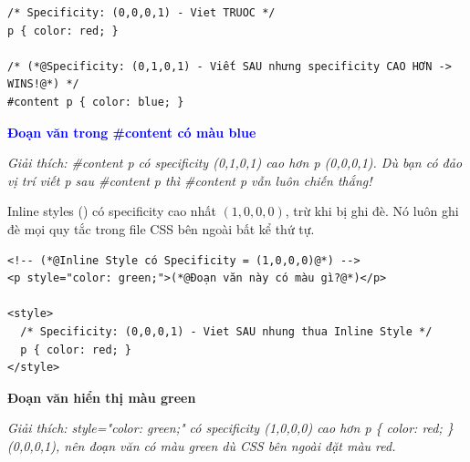 \begin{codeWindow}
\begin{lstlisting}[language=CSS3]
/* Specificity: (0,0,0,1) - Viet TRUOC */
p { color: red; }

/* (*@Specificity: (0,1,0,1) - Viết SAU nhưng specificity CAO HƠN -> WINS!@*) */
#content p { color: blue; }
\end{lstlisting}
\end{codeWindow}

\begin{browserWindow}
\sffamily\small
\textcolor{blue}{\textbf{Đoạn văn trong \#content có màu blue}} \par\vspace{4pt}
{\scriptsize\textcolor{gray!60}{\textit{Giải thích: \#content p có specificity (0,1,0,1) cao hơn p (0,0,0,1). Dù bạn có đảo vị trí viết p sau \#content p thì \#content p vẫn luôn chiến thắng!}}}
\end{browserWindow}

\begin{warnBox}
Inline styles () có specificity cao nhất $(1,0,0,0)$, trừ khi bị  ghi đè. Nó luôn ghi đè mọi quy tắc trong file CSS bên ngoài bất kể thứ tự.
\end{warnBox}

\begin{codeWindow}
\begin{lstlisting}[language=HTML5]
<!-- (*@Inline Style có Specificity = (1,0,0,0)@*) -->
<p style="color: green;">(*@Đoạn văn này có màu gì?@*)</p>

<style>
  /* Specificity: (0,0,0,1) - Viet SAU nhung thua Inline Style */
  p { color: red; }
</style>
\end{lstlisting}
\end{codeWindow}

\begin{browserWindow}
\sffamily\small
\textcolor{green!60!black}{\textbf{Đoạn văn hiển thị màu green}} \par\vspace{4pt}
{\scriptsize\textcolor{gray!60}{\textit{Giải thích: style="color: green;" có specificity (1,0,0,0) cao hơn p \{ color: red; \} (0,0,0,1), nên đoạn văn có màu green dù CSS bên ngoài đặt màu red.}}}
\end{browserWindow}

